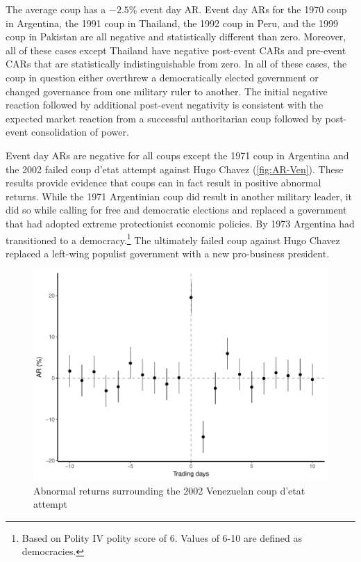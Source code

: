 \documentclass[12pt,final,fleqn]{article}
\theoremstyle{plain}
\begin{document}
The average coup has a $-2.5\%$ event day AR. Event day ARs for the 1970 coup in Argentina, the 1991 coup in Thailand, the 1992 coup in Peru, and the 1999 coup in Pakistan are all negative and statistically different than zero. Moreover, all of these cases except Thailand have negative post-event CARs and pre-event CARs that are statistically indistinguishable from zero. In all of these cases, the coup in question either overthrew a democratically elected government or changed governance from one military ruler to another. The initial negative reaction followed by additional post-event negativity is consistent with the expected market reaction from a successful authoritarian coup followed by post-event consolidation of power. 

Event day ARs are negative for all coups except the 1971 coup in Argentina and the 2002 failed coup d'etat attempt against Hugo Chavez (\autoref{fig:AR-Ven}). These results provide evidence that coups can in fact result in positive abnormal returns. While the 1971 Argentinian coup did result in another military leader, it did so while calling for free and democratic elections and replaced a government that had adopted extreme protectionist economic policies. By 1973 Argentina had transitioned to a democracy.\footnote{Based on Polity IV polity score of 6. Values of 6-10 are defined as democracies.} The ultimately failed coup against Hugo Chavez replaced a left-wing populist government with a new pro-business president.

\begin{figure}[!ht]
\includegraphics{../figs/venezuela_coup_attempt_2002.pdf}
\caption{Abnormal returns surrounding the 2002 Venezuelan coup d'etat attempt}
\label{fig:AR-Ven}
\end{figure}
\end{document}
